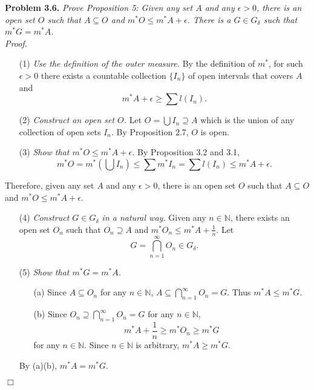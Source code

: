 \documentclass{article}
\begin{document}
\textbf{Problem 3.6.}
\emph{Prove Proposition 5:
Given any set $A$ and any $\epsilon > 0$,
there is an open set $O$ such that $A \subseteq O$
and $m^{*}O \leq m^{*}A + \epsilon$.
There is a $G \in G_{\delta}$ such that $m^{*}G = m^{*}A$.} \\

\emph{Proof.}
\begin{enumerate}
\item[(1)]
\emph{Use the definition of the outer measure.}
By the definition of $m^{*}$,
for such $\epsilon > 0$ there exists a countable collection
$\{ I_n \}$ of open intervals that covers $A$ and
$$m^{*} A + \epsilon \geq \sum l(I_n).$$
\item[(2)]
\emph{Construct an open set $O$.}
Let $O = \bigcup I_n \supseteq A$
which is the union of any collection of open sets $I_n$.
By Proposition 2.7, $O$ is open.
\item[(3)]
\emph{Show that $m^{*}O \leq m^{*}A + \epsilon$.}
By Proposition 3.2 and 3.1,
$$m^{*}O
= m^{*} \left( \bigcup I_n \right)
\leq \sum m^{*} I_n
= \sum l(I_n)
\leq m^{*} A + \epsilon.$$
\end{enumerate}
Therefore, given any set $A$ and any $\epsilon > 0$,
there is an open set $O$ such that $A \subseteq O$
and $m^{*}O \leq m^{*}A + \epsilon$.

\begin{enumerate}
\item[(4)]
\emph{Construct $G \in G_{\delta}$ in a natural way.}
Given any $n \in \mathbb{N}$, there exists an open set $O_n$
such that $O_n \supseteq A$ and $m^{*}O_n \leq m^{*}A + \frac{1}{n}$.
Let
$$G = \bigcap_{n=1}^{\infty} O_n \in G_{\delta}.$$
\item[(5)]
\emph{Show that $m^{*}G = m^{*}A$.}
  \begin{enumerate}
  \item[(a)]
  Since $A \subseteq O_n$ for any $n \in \mathbb{N}$,
  $A \subseteq \bigcap_{n=1}^{\infty} O_n = G$.
  Thus $m^{*}A \leq m^{*}G$.
  \item[(b)]
  Since $O_n \supseteq \bigcap_{n=1}^{\infty} O_n = G$ for any $n \in \mathbb{N}$,
  $$m^{*}A + \frac{1}{n} \geq m^{*}O_n \geq m^{*}G$$
  for any $n \in \mathbb{N}$.
  Since $n \in \mathbb{N}$ is arbitrary, $m^{*}A \geq m^{*}G$.
  \end{enumerate}
By (a)(b), $m^{*}A = m^{*}G$.
\end{enumerate}
$\Box$ \\\\
\end{document}
